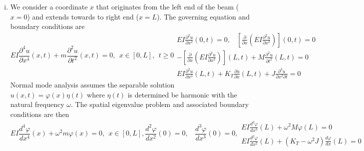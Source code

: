 \begin{enumerate}[(i)]
\item { %
    We consider a coordinate $x$ that originates from the left end of the beam ($x = 0$) and extends towards to right end ($x = L$).
    The governing equation and boundary conditions are 
    \begin{subequations}
    \begin{equation}
        EI \frac{\partial^4 u}{\partial x^4}(x, t) + m \frac{\partial^2 u}{\partial t^2}(x, t) = 0, ~~x \in [0, L], ~~ t \geq 0
    \end{equation}
    \begin{equation}
    \begin{gathered}
        EI \frac{\partial^2 u}{\partial x^2}(0, t) = 0, ~~~~ \left[\frac{\partial}{\partial x}\left(EI \frac{\partial^2 u}{\partial x^2}\right) \right](0, t) = 0 \\
        -\left[\frac{\partial}{\partial x}\left(EI \frac{\partial^2 u}{\partial x^2}\right) \right](L, t) + M \frac{\partial^2 u}{\partial t^2}(L, t) = 0 \\
        EI \frac{\partial^2 u}{\partial x^2}(L, t) + K_T \frac{\partial u}{\partial x}(L, t) + J \frac{\partial^3 u}{\partial x^2 \partial t} = 0
    \end{gathered}
    \end{equation}
    \end{subequations}
    Normal mode analysis assumes the separable solution $u(x, t) = \varphi(x) \eta(t)$ where $\eta(t)$ is determined be harmonic with the natural frequency $\omega$. 
    The spatial eigenvalue problem and associated boundary conditions are then 
    \begin{subequations}
    \begin{equation}\label{eqn:hw5_p3_spatial_eqn}
        EI \frac{d^4 \varphi}{d x^4}(x) + \omega^2 m \varphi(x) = 0, ~~x \in [0, L],
    \end{equation}
    \begin{equation}\label{eqn:hw5_p3_bc_left}
        \frac{d^2 \varphi}{d x^2}(0) = 0, ~~~~ \frac{d^3 \varphi}{d x^3}(0) = 0,
    \end{equation}
    \begin{equation}\label{eqn:hw5_p3_bc_right}
    \begin{gathered}
        EI \frac{d^3 \varphi}{dx^3}(L) + \omega^2 M \varphi(L) = 0 \\
        EI \frac{d^2 \varphi}{d x^2}(L) + (K_T - \omega^2 J) \frac{d \varphi}{d x}(L) = 0
    \end{gathered}

\end{equation}
\end{subequations}}
\end{enumerate}
